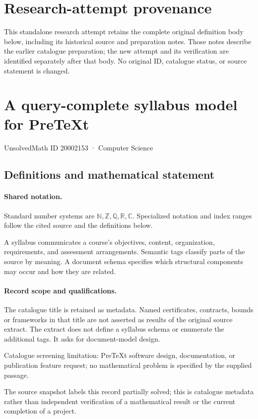 \documentclass[11pt]{article}
\begin{document}
\section*{Research-attempt provenance}
This standalone research attempt retains the complete original definition body below,
including its historical source and preparation notes. Those notes describe the
earlier catalogue preparation; the new attempt and its verification are identified
separately after that body. No original ID, catalogue status, or source statement is changed.

\section{A query-complete syllabus model for PreTeXt}\label{20002153}
{\small UnsolvedMath ID 20002153 · Computer Science}
\subsection{Definitions and mathematical statement}

\paragraph{Shared notation.}Standard number systems are $\mathbb N,\mathbb Z,\mathbb Q,\mathbb R,\mathbb C$. Specialized notation and index ranges follow the cited source and the definitions below.


A syllabus communicates a course's objectives, content, organization, requirements, and assessment arrangements. Semantic tags classify parts of the source by meaning. A document schema specifies which structural components may occur and how they are related.
\paragraph{Record scope and qualifications.}
The catalogue title is retained as metadata. Named certificates, contracts, bounds or frameworks in that title are not asserted as results of the original source extract.
The extract does not define a syllabus schema or enumerate the additional tags. It asks for document-model design.

Catalogue screening limitation: PreTeXt software design, documentation, or publication feature request; no mathematical problem is specified by the supplied passage.

The source snapshot labels this record partially solved; this is catalogue metadata rather than independent verification of a mathematical result or the current completion of a project.
\end{document}
